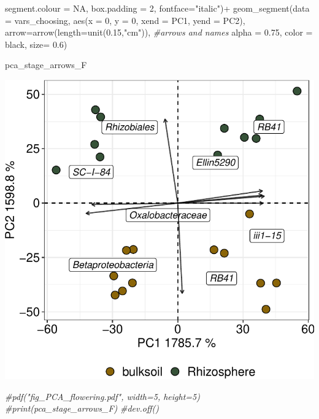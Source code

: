 \documentclass[]{interact}
\theoremstyle{plain}%
\theoremstyle{definition}
\theoremstyle{remark}
\newenvironment{Shaded}{\begin{snugshade}}{\end{snugshade}}
\newcommand{\AttributeTok}[1]{\textcolor[rgb]{0.77,0.63,0.00}{#1}}
\newcommand{\CommentTok}[1]{\textcolor[rgb]{0.56,0.35,0.01}{\textit{#1}}}
\newcommand{\ConstantTok}[1]{\textcolor[rgb]{0.00,0.00,0.00}{#1}}
\newcommand{\DecValTok}[1]{\textcolor[rgb]{0.00,0.00,0.81}{#1}}
\newcommand{\FloatTok}[1]{\textcolor[rgb]{0.00,0.00,0.81}{#1}}
\newcommand{\FunctionTok}[1]{\textcolor[rgb]{0.00,0.00,0.00}{#1}}
\newcommand{\NormalTok}[1]{#1}
\newcommand{\SpecialCharTok}[1]{\textcolor[rgb]{0.00,0.00,0.00}{#1}}
\newcommand{\StringTok}[1]{\textcolor[rgb]{0.31,0.60,0.02}{#1}}
\begin{document}
\begin{Shaded}
\begin{Highlighting}[]
                            \AttributeTok{segment.colour =} \ConstantTok{NA}\NormalTok{, }\AttributeTok{box.padding =} \DecValTok{2}\NormalTok{, }\AttributeTok{fontface=}\StringTok{"italic"}\NormalTok{)}\SpecialCharTok{+}
  \FunctionTok{geom\_segment}\NormalTok{(}\AttributeTok{data =}\NormalTok{ vars\_choosing, }\FunctionTok{aes}\NormalTok{(}\AttributeTok{x =} \DecValTok{0}\NormalTok{, }\AttributeTok{y =} \DecValTok{0}\NormalTok{, }\AttributeTok{xend =}\NormalTok{ PC1, }\AttributeTok{yend =}\NormalTok{ PC2), }
               \AttributeTok{arrow=}\FunctionTok{arrow}\NormalTok{(}\AttributeTok{length=}\FunctionTok{unit}\NormalTok{(}\FloatTok{0.15}\NormalTok{,}\StringTok{"cm"}\NormalTok{)), }\CommentTok{\#arrows and names}
               \AttributeTok{alpha =} \FloatTok{0.75}\NormalTok{, }\AttributeTok{color =} \StringTok{\textquotesingle{}black\textquotesingle{}}\NormalTok{, }\AttributeTok{size=} \FloatTok{0.6}\NormalTok{)}

\NormalTok{pca\_stage\_arrows\_F}
\end{Highlighting}
\end{Shaded}

\begin{center}\includegraphics{Doc_pdf_files/figure-latex/unnamed-chunk-37-1} \end{center}

\begin{Shaded}
\begin{Highlighting}[]
\CommentTok{\#pdf("fig\_PCA\_flowering.pdf", width=5, height=5)}
\CommentTok{\#print(pca\_stage\_arrows\_F)}
\CommentTok{\#dev.off()}
\end{Highlighting}
\end{Shaded}
\end{document}
